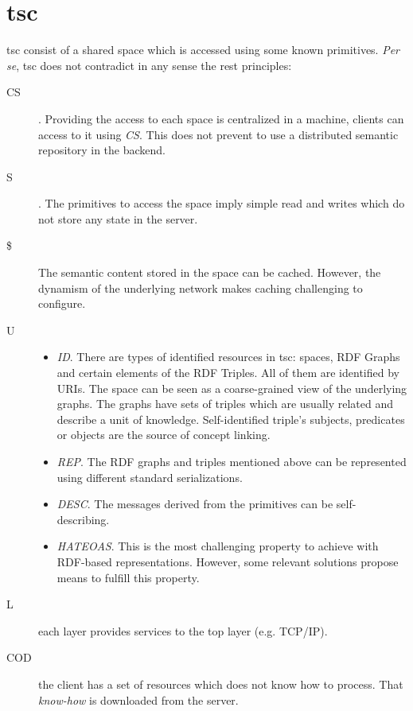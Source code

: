 \section{\acl{tsc}}
\label{sec:tsc_vs_rest}

\ac{tsc} consist of a shared space which is accessed using some known primitives.
\emph{Per se}, \ac{tsc} does not contradict in any sense the \ac{rest} principles:

\begin{description}
 \item[CS]. Providing the access to each space is centralized in a machine, clients can access to it using \emph{CS}.
           This does not prevent to use a distributed semantic repository in the backend.
 \item[S]. The primitives to access the space imply simple read and writes which do not store any state in the server.
 \item[\$] The semantic content stored in the space can be cached.
           However, the dynamism of the underlying network makes caching challenging to configure. %
 \item[U]
    \begin{itemize}
	\item \emph{ID}. There are types of identified resources in \ac{tsc}: spaces, RDF Graphs and certain elements of the RDF Triples.
	                 All of them are identified by URIs.
	                 The space can be seen as a coarse-grained view of the underlying graphs. %
	                 The graphs have sets of triples which are usually related and describe a unit of knowledge. %
	                 Self-identified triple's subjects, predicates or objects are the source of concept linking.
	\item \emph{REP}. The RDF graphs and triples mentioned above can be represented using different standard serializations.
	\item \emph{DESC}. The messages derived from the primitives can be self-describing.
	\item \emph{HATEOAS}. This is the most challenging property to achieve with RDF-based representations.
	                      However, some relevant solutions propose means to fulfill this property.
    \end{itemize}
 \item[L] each layer provides services to the top layer (e.g. TCP/IP). %
 \item[COD] the client has a set of resources which does not know how to process.
       That \emph{know-how} is downloaded from the server.
\end{description}



